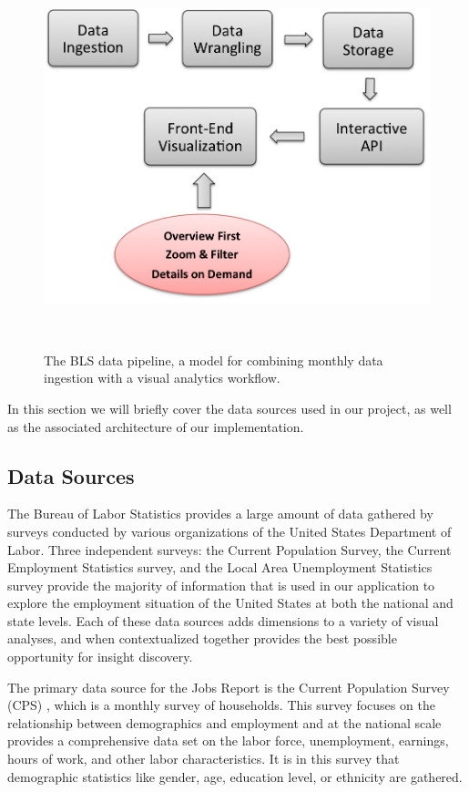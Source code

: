 \documentclass{sigchi}
\begin{document}
\begin{figure}[!h]
    \centering
    \includegraphics[width=0.9\columnwidth]{figures/pipeline.png}
    \caption{The BLS data pipeline, a model for combining monthly data ingestion with a visual analytics workflow.}~\label{fig:pipline}
\end{figure}

In this section we will briefly cover the data sources used in our project, as well as the associated architecture of our implementation.

\subsection{Data Sources}

The Bureau of Labor Statistics provides a large amount of data gathered by surveys conducted by various organizations of the United States Department of Labor. Three independent surveys: the Current Population Survey, the Current Employment Statistics survey, and the Local Area Unemployment Statistics survey provide the majority of information that is used in our application to explore the employment situation of the United States at both the national and state levels. Each of these data sources adds dimensions to a variety of visual analyses, and when contextualized together provides the best possible opportunity for insight discovery.

The primary data source for the Jobs Report is the Current Population Survey (CPS) \cite{_labor_????}, which is a monthly survey of households. This survey focuses on the relationship between demographics and employment and at the national scale provides a comprehensive data set on the labor force, unemployment, earnings, hours of work, and other labor characteristics. It is in this survey that demographic statistics like gender, age, education level, or ethnicity are gathered.
\end{document}

